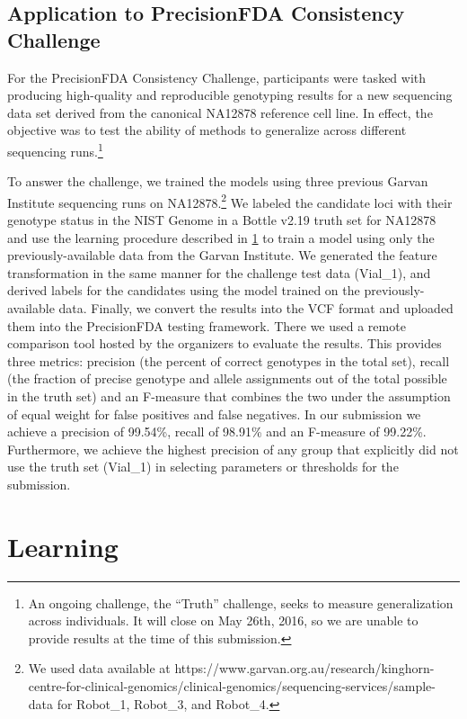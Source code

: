 \documentclass{article}
\begin{document}
\subsection{Application to PrecisionFDA Consistency Challenge}

For the PrecisionFDA Consistency Challenge, participants were tasked with producing high-quality and reproducible genotyping results for a new sequencing data set derived from the canonical NA12878 reference cell line.
In effect, the objective was to test the ability of methods to generalize across different sequencing runs.\footnote{An ongoing challenge, the ``Truth'' challenge, seeks to measure generalization across individuals. It will close on May 26th, 2016, so we are unable to provide results at the time of this submission.}

To answer the challenge, we trained the models using three previous Garvan Institute sequencing runs on NA12878.\footnote{We used data available at https://www.garvan.org.au/research/kinghorn-centre-for-clinical-genomics/clinical-genomics/sequencing-services/sample-data for Robot\_1, Robot\_3, and Robot\_4.}
We labeled the candidate loci with their genotype status in the NIST Genome in a Bottle v2.19 truth set for NA12878 and use the learning procedure described in \ref{sec:learning} to train a model using only the previously-available data from the Garvan Institute.
We generated the feature transformation in the same manner for the challenge test data (Vial\_1), and derived labels for the candidates using the model trained on the previously-available data.
Finally, we convert the results into the VCF format and uploaded them into the PrecisionFDA testing framework.
There we used a remote comparison tool hosted by the organizers to evaluate the results.
This provides three metrics: precision (the percent of correct genotypes in the total set), recall (the fraction of precise genotype and allele assignments out of the total possible in the truth set) and an F-measure that combines the two under the assumption of equal weight for false positives and false negatives.
In our submission we achieve a precision of 99.54\%, recall of 98.91\% and an F-measure of 99.22\%.
Furthermore, we achieve the highest precision of any group that explicitly did not use the truth set (Vial\_1) in selecting parameters or thresholds for the submission.

\section{Learning}
\label{sec:learning}
\end{document}
